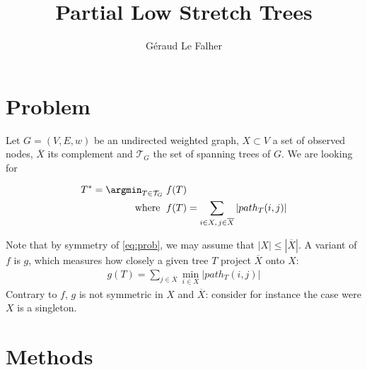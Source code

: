 \documentclass[a4paper,draft,notitlepage,11pt,svgnames]{scrartcl}
\title{Partial Low Stretch Trees}
\author{Géraud Le Falher}
\newcommand{\stcomp}[1]{\ensuremath{\overline{#1}}}
\newcommand{\allst}{\ensuremath{\mathcal{T}_G}}
\begin{document}
\maketitle

\section*{Problem}

Let $G=(V,E,w)$ be an undirected weighted graph, $X \subset V$ a set of observed
nodes, $\stcomp{X}$ its complement and \allst{} the set of spanning
trees of $G$. We are looking for

\begin{align}
	T^* = \argmin_{T \in \mathcal{T}_G} \; & f(T) \notag \\
	\text{where }\; & f(T) = \sum_{i \in X ,\,j \in \stcomp{X}} \left| path_T(i, j) \right |
	\label{eq:prob}
\end{align}

Note that by symmetry of \eqref{eq:prob}, we may assume that $|X| \leq
\left| \stcomp{X}\right|$. A variant of $f$ is $g$, which measures how closely
a given tree $T$ project $\stcomp{X}$ onto $X$:
\begin{align}
	g(T)= \sum_{j \in \stcomp{X}} \min_{i \in X} \left| path_T(i, j) \right |
\end{align}
Contrary to $f$, $g$ is not symmetric in $X$ and $\stcomp{X}$: consider for
instance the case were $X$ is a singleton.

\section*{Methods}
\end{document}
